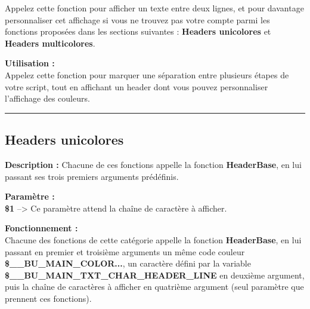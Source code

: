 \documentclass[a4paper,10pt]{article}
\begin{document}
\begin{justify}
    Appelez cette fonction pour afficher un texte entre deux lignes, et pour davantage personnaliser cet affichage si vous ne trouvez pas votre compte parmi les fonctions proposées dans les sections suivantes : \textbf{\color{green}Headers unicolores} et \textbf{\color{green}Headers multicolores}.
\end{justify}

\begin{justify}
    \textbf{Utilisation :}\\
    Appelez cette fonction pour marquer une séparation entre plusieurs étapes de votre script, tout en affichant un header dont vous pouvez personnaliser l'affichage des couleurs.
\end{justify}




\color{green}\par\noindent\rule{\textwidth}{0.4pt}\color{white}

\color{green}
\subsection{Headers unicolores}\color{white}

\begin{justify}
    \textbf{Description :}
    Chacune de ces fonctions appelle la fonction \textbf{\color{mauve}HeaderBase}, en lui passant ses trois premiers arguments prédéfinis.
\end{justify}

\begin{justify}
    \textbf{Paramètre :}\\
    \textbf{\color{orange}\$1} --> Ce paramètre attend la chaîne de caractère à afficher.
\end{justify}

\begin{justify}
    \textbf{Fonctionnement :}\\
    Chacune des fonctions de cette catégorie appelle la fonction \textbf{\color{mauve}HeaderBase}, en lui passant en premier et troisième arguments un même code couleur \textbf{\color{orange}\$\_\_BU\_MAIN\_COLOR...}, un caractère défini par la variable \textbf{\color{orange}\$\_\_BU\_MAIN\_TXT\_CHAR\_HEADER\_LINE} en deuxième argument, puis la chaîne de caractères à afficher en quatrième argument (seul paramètre que prennent ces fonctions).
\end{justify}
\end{document}
